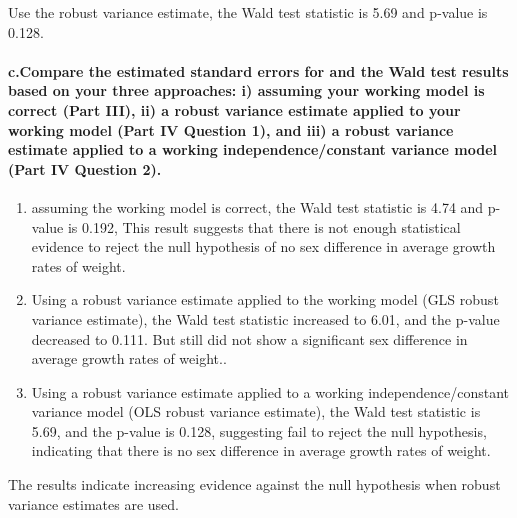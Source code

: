 \documentclass[
]{article}
\begin{document}
Use the robust variance estimate, the Wald test statistic is 5.69 and
p-value is 0.128.

\hypertarget{c.compare-the-estimated-standard-errors-for-and-the-wald-test-results-based-on-your-three-approaches-i-assuming-your-working-model-is-correct-part-iii-ii-a-robust-variance-estimate-applied-to-your-working-model-part-iv-question-1-and-iii-a-robust-variance-estimate-applied-to-a-working-independenceconstant-variance-model-part-iv-question-2.}{%
\paragraph{c.Compare the estimated standard errors for and the Wald test
results based on your three approaches: i) assuming your working model
is correct (Part III), ii) a robust variance estimate applied to your
working model (Part IV Question 1), and iii) a robust variance estimate
applied to a working independence/constant variance model (Part IV
Question
2).}\label{c.compare-the-estimated-standard-errors-for-and-the-wald-test-results-based-on-your-three-approaches-i-assuming-your-working-model-is-correct-part-iii-ii-a-robust-variance-estimate-applied-to-your-working-model-part-iv-question-1-and-iii-a-robust-variance-estimate-applied-to-a-working-independenceconstant-variance-model-part-iv-question-2.}}

\begin{enumerate}
\def\labelenumi{\roman{enumi})}
\item
  assuming the working model is correct, the Wald test statistic is 4.74
  and p-value is 0.192, This result suggests that there is not enough
  statistical evidence to reject the null hypothesis of no sex
  difference in average growth rates of weight.
\item
  Using a robust variance estimate applied to the working model (GLS
  robust variance estimate), the Wald test statistic increased to 6.01,
  and the p-value decreased to 0.111. But still did not show a
  significant sex difference in average growth rates of weight..
\item
  Using a robust variance estimate applied to a working
  independence/constant variance model (OLS robust variance estimate),
  the Wald test statistic is 5.69, and the p-value is 0.128, suggesting
  fail to reject the null hypothesis, indicating that there is no sex
  difference in average growth rates of weight.
\end{enumerate}

The results indicate increasing evidence against the null hypothesis
when robust variance estimates are used.
\end{document}
